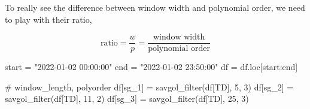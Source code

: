 \documentclass[
  letterpaper,
  DIV=11,
  numbers=noendperiod,
  oneside]{scrreprt}
\newenvironment{Shaded}{\begin{snugshade}}{\end{snugshade}}
\newcommand{\CommentTok}[1]{\textcolor[rgb]{0.37,0.37,0.37}{#1}}
\newcommand{\DecValTok}[1]{\textcolor[rgb]{0.68,0.00,0.00}{#1}}
\newcommand{\NormalTok}[1]{\textcolor[rgb]{0.00,0.23,0.31}{#1}}
\newcommand{\OperatorTok}[1]{\textcolor[rgb]{0.37,0.37,0.37}{#1}}
\newcommand{\StringTok}[1]{\textcolor[rgb]{0.13,0.47,0.30}{#1}}
\begin{document}
To really see the difference between window width and polynomial order,
we need to play with their ratio,

\[
\text{ratio} = \frac{w}{p} = \frac{\text{window width}}{\text{polynomial order}}
\]

\begin{Shaded}
\begin{Highlighting}[]
\NormalTok{start }\OperatorTok{=} \StringTok{"2022{-}01{-}02 00:00:00"}
\NormalTok{end }\OperatorTok{=} \StringTok{"2022{-}01{-}02 23:50:00"}
\NormalTok{df }\OperatorTok{=}\NormalTok{ df.loc[start:end]}
\end{Highlighting}
\end{Shaded}

\begin{Shaded}
\begin{Highlighting}[]
\CommentTok{\# window\_length, polyorder}
\NormalTok{df[}\StringTok{\textquotesingle{}sg\_1\textquotesingle{}}\NormalTok{] }\OperatorTok{=}\NormalTok{ savgol\_filter(df[}\StringTok{\textquotesingle{}TD\textquotesingle{}}\NormalTok{], }\DecValTok{5}\NormalTok{, }\DecValTok{3}\NormalTok{)}
\NormalTok{df[}\StringTok{\textquotesingle{}sg\_2\textquotesingle{}}\NormalTok{] }\OperatorTok{=}\NormalTok{ savgol\_filter(df[}\StringTok{\textquotesingle{}TD\textquotesingle{}}\NormalTok{], }\DecValTok{11}\NormalTok{, }\DecValTok{2}\NormalTok{)}
\NormalTok{df[}\StringTok{\textquotesingle{}sg\_3\textquotesingle{}}\NormalTok{] }\OperatorTok{=}\NormalTok{ savgol\_filter(df[}\StringTok{\textquotesingle{}TD\textquotesingle{}}\NormalTok{], }\DecValTok{25}\NormalTok{, }\DecValTok{3}\NormalTok{)}
\end{Highlighting}
\end{Shaded}
\end{document}
